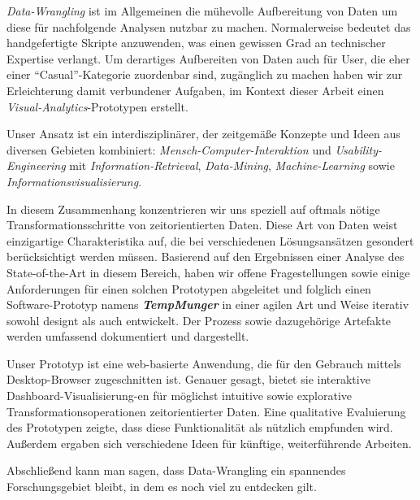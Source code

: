 \documentclass[draft,final]{vutinfth} %
\begin{document}
\begin{kurzfassung}
\emph{Data-Wrangling} ist im Allgemeinen die mühevolle Aufbereitung von Daten um diese für nachfolgende Analysen nutzbar zu machen.
Normalerweise bedeutet das handgefertigte Skripte anzuwenden, was einen gewissen Grad an technischer Expertise verlangt.
Um derartiges Aufbereiten von Daten auch für User, die eher einer ``Casual''-Kategorie zuordenbar sind, zugänglich zu machen haben wir zur Erleichterung damit verbundener Aufgaben, im Kontext dieser Arbeit einen \emph{Visual-Analytics}-Prototypen erstellt.

Unser Ansatz ist ein interdisziplinärer, der zeitgemäße Konzepte und Ideen aus diversen Gebieten kombiniert:
\emph{Mensch-Computer-Interaktion} und \emph{Usability-Engineering} mit \emph{Information-Retrieval}, \emph{Data-Mining}, \emph{Machine-Learning} sowie \emph{Informationsvisualisierung}.

In diesem Zusammenhang konzentrieren wir uns speziell auf oftmals nötige Transformationsschritte von zeitorientierten Daten.
Diese Art von Daten weist einzigartige Charakteristika auf, die bei verschiedenen Lösungsansätzen gesondert berücksichtigt werden müssen.
Basierend auf den Ergebnissen einer Analyse des State-of-the-Art in diesem Bereich, haben wir offene Fragestellungen sowie einige Anforderungen für einen solchen Prototypen abgeleitet und folglich einen Software-Prototyp namens \textbf{\emph{TempMunger}} in einer agilen Art und Weise iterativ sowohl designt als auch entwickelt.
Der Prozess sowie dazugehörige Artefakte werden umfassend dokumentiert und dargestellt.

Unser Prototyp ist eine web-basierte Anwendung, die für den Gebrauch mittels Desktop-Browser zugeschnitten ist.
Genauer gesagt, bietet sie interaktive Dashboard-Visualisierung-en für möglichst intuitive sowie explorative Transformationsoperationen zeitorientierter Daten.
Eine qualitative Evaluierung des Prototypen zeigte, dass diese Funktionalität als nützlich empfunden wird.
Außerdem ergaben sich verschiedene Ideen für künftige, weiterführende Arbeiten.

Abschließend kann man sagen, dass Data-Wrangling ein spannendes Forschungsgebiet bleibt, in dem es noch viel zu entdecken gilt.
\end{kurzfassung}
\end{document}
